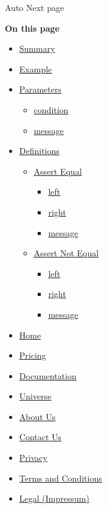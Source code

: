 \href{/docs/reference/foundations/auto/}{\pandocbounded{}}

{ Auto } { Next page }

\textbf{On this page}

\begin{itemize}
\tightlist
\item
  \hyperref[summary]{Summary}
\item
  \hyperref[example]{Example}
\item
  \hyperref[parameters]{Parameters}

  \begin{itemize}
  \tightlist
  \item
    \hyperref[parameters-condition]{condition}
  \item
    \hyperref[parameters-message]{message}
  \end{itemize}
\item
  \hyperref[definitions]{Definitions}

  \begin{itemize}
  \tightlist
  \item
    \hyperref[definitions-eq]{Assert Equal}

    \begin{itemize}
    \tightlist
    \item
      \hyperref[definitions-eq-left]{left}
    \item
      \hyperref[definitions-eq-right]{right}
    \item
      \hyperref[definitions-eq-message]{message}
    \end{itemize}
  \item
    \hyperref[definitions-ne]{Assert Not Equal}

    \begin{itemize}
    \tightlist
    \item
      \hyperref[definitions-ne-left]{left}
    \item
      \hyperref[definitions-ne-right]{right}
    \item
      \hyperref[definitions-ne-message]{message}
    \end{itemize}
  \end{itemize}
\end{itemize}

\begin{itemize}
\tightlist
\item
  \href{/}{Home}
\item
  \href{/pricing/}{Pricing}
\item
  \href{/docs/}{Documentation}
\item
  \href{/universe/}{Universe}
\item
  \href{/about/}{About Us}
\item
  \href{/contact/}{Contact Us}
\item
  \href{/privacy/}{Privacy}
\item
  \href{https://typst.app/terms}{Terms and Conditions}
\item
  \href{/legal/}{Legal (Impressum)}
\end{itemize}

